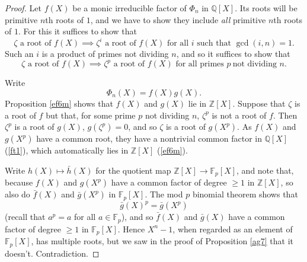 \documentclass[a4paper,11pt,final,openany]{memoir}
\theoremstyle{nonumberplain}
\newtheorem{proof}{Proof.}
\begin{document}
\begin{proof}
Let $f(X)$ be a monic irreducible factor of $\Phi_{n}$ in $\mathbb{Q}[X]$. Its
roots will be primitive $n$th roots of $1$, and we have to show they include
\textit{all} primitive $n$th roots of $1$. For this it suffices to show that
\[
\zeta\text{\ a root of }f(X)\implies\zeta^{i}\text{\ a root of }%
f(X)\text{\ for all }i\text{\ such that }\gcd(i,n)=1.
\]
Such an $i$ is a product of primes not dividing $n$, and so it suffices to
show that
\[
\zeta\text{\ a root of }f(X)\implies\zeta^{p}\text{\ a root of $f(X)$ for all
primes }p\ \text{not dividing }n.
\]


Write
\[
\Phi_{n}(X)=f(X)g(X)\text{.}%
\]
Proposition \ref{ef6m} shows that $f(X)$ and $g(X)$ lie in $\mathbb{Z}[X]$.
Suppose that $\zeta$ is a root of $f$ but that, for some prime $p$ not
dividing $n$, $\zeta^{p}$ is not a root of $f$. Then $\zeta^{p}$ is a root of
$g(X)$, $g(\zeta^{p})=0$, and so $\zeta$ is a root of $g(X^{p})$. As $f(X)$
and $g(X^{p})$ have a common root, they have a nontrivial common factor in
$\mathbb{Q}{}[X]$ (\ref{ft1}), which automatically lies in $\mathbb{Z}{}[X]$
(\ref{ef6m}).

Write $h(X)\mapsto\bar{h}(X)$ for the quotient map $\mathbb{Z}[X]\rightarrow
\mathbb{F}_{p}[X]$, and note that, because $f(X)$ and $g(X^{p})$ have a common
factor of degree $\geq1$ in $\mathbb{Z}{}[X]$, so also do $\bar{f}(X)$ and
$\bar{g}(X^{p})$ in $\mathbb{F}{}_{p}[X]$. The mod $p$ binomial theorem shows
that
\[
\bar{g}(X)^{p}=\bar{g}(X^{p})
\]
(recall that $a^{p}=a$ for all $a\in\mathbb{F}{}_{p}$), and so $\bar{f}(X)$
and $\bar{g}(X)$ have a common factor of degree $\geq1$ in $\mathbb{F}{}%
_{p}[X]$. Hence $X^{n}-1$, when regarded as an element of $\mathbb{F}_{p}[X]$,
has multiple roots, but we saw in the proof of Proposition \ref{ag7} that it
doesn't. Contradiction.
\end{proof}
\end{document}
